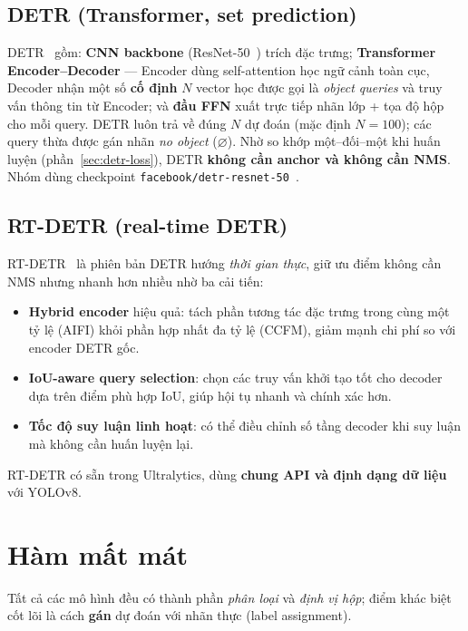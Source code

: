 \documentclass[12pt]{article}
\numberwithin{equation}{section}
\begin{document}
\subsection{DETR (Transformer, set prediction)}
\label{sec:detr}

DETR~\cite{detr} gồm: \textbf{CNN backbone} (ResNet-50~\cite{resnet}) trích đặc trưng;
\textbf{Transformer Encoder--Decoder} --- Encoder dùng self-attention học ngữ cảnh toàn cục,
Decoder nhận một số \textbf{cố định} $N$ vector học được gọi là \textit{object queries} và
truy vấn thông tin từ Encoder; và \textbf{đầu FFN} xuất trực tiếp nhãn lớp + tọa độ hộp cho
mỗi query. DETR luôn trả về đúng $N$ dự đoán (mặc định $N=100$); các query thừa được gán nhãn
\textit{no object} ($\varnothing$). Nhờ so khớp một--đối--một khi huấn luyện
(phần~\ref{sec:detr-loss}), DETR \textbf{không cần anchor và không cần NMS}. Nhóm dùng
checkpoint \texttt{facebook/detr-resnet-50}~\cite{huggingface}.

\subsection{RT-DETR (real-time DETR)}

RT-DETR~\cite{rtdetr} là phiên bản DETR hướng \textit{thời gian thực}, giữ ưu điểm không cần
NMS nhưng nhanh hơn nhiều nhờ ba cải tiến:
\begin{itemize}
  \item \textbf{Hybrid encoder} hiệu quả: tách phần tương tác đặc trưng trong cùng một tỷ lệ
  (AIFI) khỏi phần hợp nhất đa tỷ lệ (CCFM), giảm mạnh chi phí so với encoder DETR gốc.
  \item \textbf{IoU-aware query selection}: chọn các truy vấn khởi tạo tốt cho decoder dựa
  trên điểm phù hợp IoU, giúp hội tụ nhanh và chính xác hơn.
  \item \textbf{Tốc độ suy luận linh hoạt}: có thể điều chỉnh số tầng decoder khi suy luận mà
  không cần huấn luyện lại.
\end{itemize}
RT-DETR có sẵn trong Ultralytics, dùng \textbf{chung API và định dạng dữ liệu} với YOLOv8.

\section{Hàm mất mát}

Tất cả các mô hình đều có thành phần \textit{phân loại} và \textit{định vị hộp}; điểm khác
biệt cốt lõi là cách \textbf{gán} dự đoán với nhãn thực (label assignment).
\end{document}
